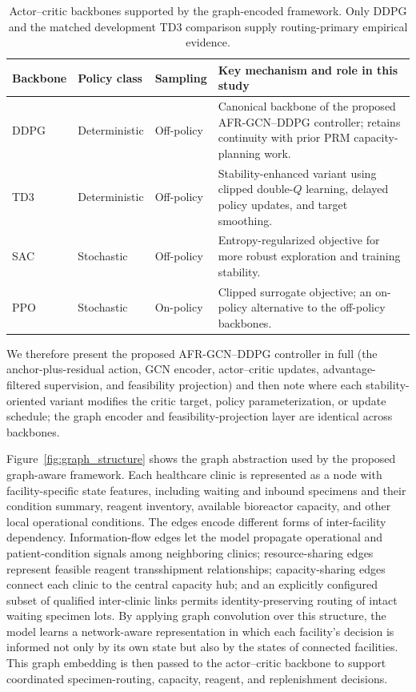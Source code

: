 \documentclass[preprint,review,12pt]{elsarticle}
\begin{document}
\begin{table}[htbp]
\centering
\small
\caption{Actor--critic backbones supported by the graph-encoded framework. Only DDPG and the matched development TD3 comparison supply routing-primary empirical evidence.}
\label{tab:backbone_family}
\setlength{\tabcolsep}{4pt}
\renewcommand{\arraystretch}{1.15}
\begin{tabularx}{\textwidth}{p{} p{} p{} X}
\toprule
Backbone & Policy class & Sampling & Key mechanism and role in this study \\
\midrule
DDPG~\cite{Lillicrap2016DDPG} & Deterministic & Off-policy & Canonical backbone of the proposed AFR-GCN--DDPG controller; retains continuity with prior PRM capacity-planning work. \\
TD3~\cite{Fujimoto2018TD3} & Deterministic & Off-policy & Stability-enhanced variant using clipped double-$Q$ learning, delayed policy updates, and target smoothing. \\
SAC~\cite{Haarnoja2018SAC} & Stochastic & Off-policy & Entropy-regularized objective for more robust exploration and training stability. \\
PPO~\cite{Schulman2017PPO} & Stochastic & On-policy & Clipped surrogate objective; an on-policy alternative to the off-policy backbones. \\
\bottomrule
\end{tabularx}
\end{table}

We therefore present the proposed AFR-GCN--DDPG controller in full (the anchor-plus-residual action, GCN encoder, actor--critic updates, advantage-filtered supervision, and feasibility projection) and then note where each stability-oriented variant modifies the critic target, policy parameterization, or update schedule; the graph encoder and feasibility-projection layer are identical across backbones.

Figure~\ref{fig:graph_structure} shows the graph abstraction used by the proposed graph-aware framework. Each healthcare clinic is represented as a node with facility-specific state features, including waiting and inbound specimens and their condition summary, reagent inventory, available bioreactor capacity, and other local operational conditions. The edges encode different forms of inter-facility dependency. Information-flow edges let the model propagate operational and patient-condition signals among neighboring clinics; resource-sharing edges represent feasible reagent transshipment relationships; capacity-sharing edges connect each clinic to the central capacity hub; and an explicitly configured subset of qualified inter-clinic links permits identity-preserving routing of intact waiting specimen lots. By applying graph convolution over this structure, the model learns a network-aware representation in which each facility's decision is informed not only by its own state but also by the states of connected facilities. This graph embedding is then passed to the actor--critic backbone to support coordinated specimen-routing, capacity, reagent, and replenishment decisions.
\end{document}

